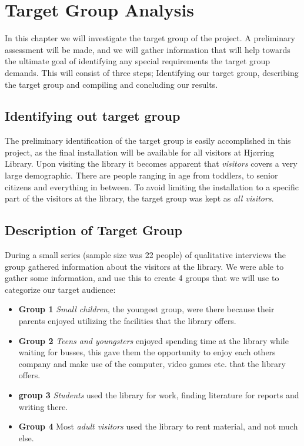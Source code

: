 \chapter{Target Group Analysis}

In this chapter we will investigate the target group of the project. A preliminary assessment will be made, and we will gather information that will help towards the ultimate goal of identifying any special requirements the target group demands. This will consist of three steps; Identifying our target group, describing the target group and compiling and concluding our results.

\section{Identifying out target group}
The preliminary identification of the target group is easily accomplished in this project, as the final installation will be available for all visitors at Hj{\o}rring Library. Upon visiting the library it becomes apparent that \textit{visitors} covers a very large demographic. There are people ranging in age from toddlers, to senior citizens and everything in between. To avoid limiting the installation to a specific part of the visitors at the library, the target group was kept as \textit{all visitors}.

\section{Description of Target Group}
During a small series (sample size was 22 people) of qualitative interviews the group gathered information about the visitors at the library. We were able to gather some information, and use this to create 4 groups that we will use to categorize our target audience:

\begin{itemize}

\item \textbf{Group 1} \textit{Small children}, the youngest group, were there because their parents enjoyed utilizing the facilities that the library offers.

\item \textbf{Group 2} \textit{Teens and youngsters} enjoyed spending time at the library while waiting for busses, this gave them the opportunity to enjoy each others company and make use of the computer, video games etc. that the library offers.

\item \textbf{group 3} \textit{Students} used the library for work, finding literature for reports and writing there.

\item \textbf{Group 4} Most \textit{adult visitors} used the library to rent material, and not much else.

\end{itemize}

